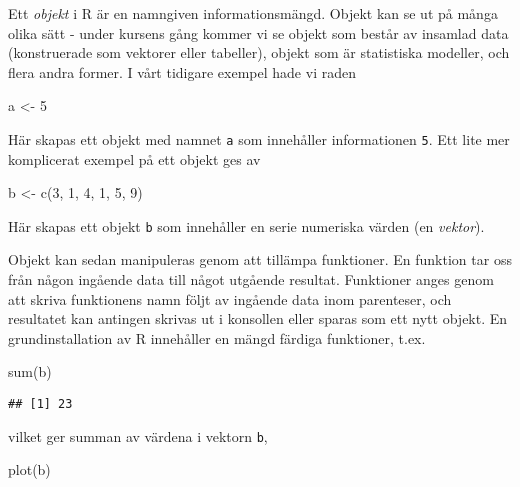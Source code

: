 \documentclass[
]{book}
\newenvironment{Shaded}{\begin{snugshade}}{\end{snugshade}}
\newcommand{\DecValTok}[1]{\textcolor[rgb]{0.00,0.00,0.81}{#1}}
\newcommand{\FunctionTok}[1]{\textcolor[rgb]{0.00,0.00,0.00}{#1}}
\newcommand{\NormalTok}[1]{#1}
\newcommand{\OtherTok}[1]{\textcolor[rgb]{0.56,0.35,0.01}{#1}}
\theoremstyle{definition}
\theoremstyle{definition}
\theoremstyle{definition}
\theoremstyle{definition}
\theoremstyle{remark}
\begin{document}
Ett \emph{objekt} i R är en namngiven informationsmängd. Objekt kan se ut på många olika sätt - under kursens gång kommer vi se objekt som består av insamlad data (konstruerade som vektorer eller tabeller), objekt som är statistiska modeller, och flera andra former. I vårt tidigare exempel hade vi raden

\begin{Shaded}
\begin{Highlighting}[]
\NormalTok{a }\OtherTok{\textless{}{-}} \DecValTok{5}
\end{Highlighting}
\end{Shaded}

Här skapas ett objekt med namnet \texttt{a} som innehåller informationen \texttt{5}.
Ett lite mer komplicerat exempel på ett objekt ges av

\begin{Shaded}
\begin{Highlighting}[]
\NormalTok{b }\OtherTok{\textless{}{-}} \FunctionTok{c}\NormalTok{(}\DecValTok{3}\NormalTok{, }\DecValTok{1}\NormalTok{, }\DecValTok{4}\NormalTok{, }\DecValTok{1}\NormalTok{, }\DecValTok{5}\NormalTok{, }\DecValTok{9}\NormalTok{)}
\end{Highlighting}
\end{Shaded}

Här skapas ett objekt \texttt{b} som innehåller en serie numeriska värden (en \emph{vektor}).

Objekt kan sedan manipuleras genom att tillämpa funktioner. En funktion tar oss från någon ingående data till något utgående resultat. Funktioner anges genom att skriva funktionens namn följt av ingående data inom parenteser, och resultatet kan antingen skrivas ut i konsollen eller sparas som ett nytt objekt. En grundinstallation av R innehåller en mängd färdiga funktioner, t.ex.

\begin{Shaded}
\begin{Highlighting}[]
\FunctionTok{sum}\NormalTok{(b)}
\end{Highlighting}
\end{Shaded}

\begin{verbatim}
## [1] 23
\end{verbatim}

vilket ger summan av värdena i vektorn \texttt{b},

\begin{Shaded}
\begin{Highlighting}[]
\FunctionTok{plot}\NormalTok{(b)}
\end{Highlighting}
\end{Shaded}
\end{document}
